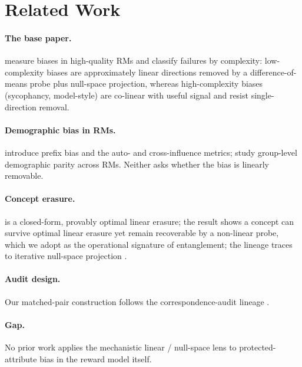 \section{Related Work}
\label{sec:related}
\paragraph{The base paper.} \citet{fein2026onebias} measure biases in high-quality RMs and classify failures
by complexity: low-complexity biases are approximately linear directions removed by a difference-of-means
probe plus null-space projection, whereas high-complexity biases (sycophancy, model-style) are co-linear with
useful signal and resist single-direction removal. \paragraph{Demographic bias in RMs.} \citet{kumar2025prefix}
introduce prefix bias and the auto- and cross-influence metrics; \citet{song2025groupfairness} study
group-level demographic parity across RMs. Neither asks whether the bias is linearly removable.
\paragraph{Concept erasure.} \leace{} \citep{belrose2023leace} is a closed-form, provably optimal linear
erasure; the \taco{} result \citep{taco2024} shows a concept can survive optimal linear erasure yet remain
recoverable by a non-linear probe, which we adopt as the operational signature of entanglement; the lineage
traces to iterative null-space projection \citep{ravfogel2020nullitout}. \paragraph{Audit design.} Our
matched-pair construction follows the correspondence-audit lineage \citep{tamkin2023discrimeval,haim2024whatsinaname}.
\paragraph{Gap.} No prior work applies the mechanistic linear / null-space lens to protected-attribute bias
in the reward model itself.
